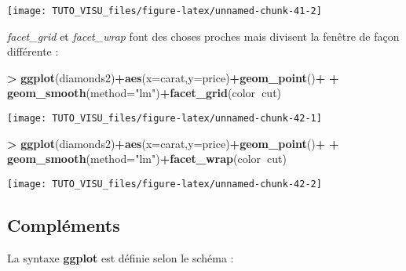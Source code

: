 \documentclass[]{article}
\newenvironment{Shaded}{\begin{snugshade}}{\end{snugshade}}
\newcommand{\DataTypeTok}[1]{\textcolor[rgb]{0.13,0.29,0.53}{#1}}
\newcommand{\KeywordTok}[1]{\textcolor[rgb]{0.13,0.29,0.53}{\textbf{#1}}}
\newcommand{\NormalTok}[1]{#1}
\newcommand{\OperatorTok}[1]{\textcolor[rgb]{0.81,0.36,0.00}{\textbf{#1}}}
\newcommand{\StringTok}[1]{\textcolor[rgb]{0.31,0.60,0.02}{#1}}
\theoremstyle{definition}
\theoremstyle{definition}
\theoremstyle{definition}
\theoremstyle{remark}
\begin{document}
\begin{center}\texttt{[image: TUTO\_VISU\_files/figure-latex/unnamed-chunk-41-2]} \end{center}

\emph{facet\_grid} et \emph{facet\_wrap} font des choses proches mais divisent la fenêtre de façon différente :

\begin{Shaded}
\begin{Highlighting}[]
\OperatorTok{>}\StringTok{ }\KeywordTok{ggplot}\NormalTok{(diamonds2)}\OperatorTok{+}\KeywordTok{aes}\NormalTok{(}\DataTypeTok{x=}\NormalTok{carat,}\DataTypeTok{y=}\NormalTok{price)}\OperatorTok{+}\KeywordTok{geom_point}\NormalTok{()}\OperatorTok{+}
\OperatorTok{+}\StringTok{   }\KeywordTok{geom_smooth}\NormalTok{(}\DataTypeTok{method=}\StringTok{"lm"}\NormalTok{)}\OperatorTok{+}\KeywordTok{facet_grid}\NormalTok{(color}\OperatorTok{~}\NormalTok{cut)}
\end{Highlighting}
\end{Shaded}

\begin{center}\texttt{[image: TUTO\_VISU\_files/figure-latex/unnamed-chunk-42-1]} \end{center}

\begin{Shaded}
\begin{Highlighting}[]
\OperatorTok{>}\StringTok{ }\KeywordTok{ggplot}\NormalTok{(diamonds2)}\OperatorTok{+}\KeywordTok{aes}\NormalTok{(}\DataTypeTok{x=}\NormalTok{carat,}\DataTypeTok{y=}\NormalTok{price)}\OperatorTok{+}\KeywordTok{geom_point}\NormalTok{()}\OperatorTok{+}
\OperatorTok{+}\StringTok{   }\KeywordTok{geom_smooth}\NormalTok{(}\DataTypeTok{method=}\StringTok{"lm"}\NormalTok{)}\OperatorTok{+}\KeywordTok{facet_wrap}\NormalTok{(color}\OperatorTok{~}\NormalTok{cut)}
\end{Highlighting}
\end{Shaded}

\begin{center}\texttt{[image: TUTO\_VISU\_files/figure-latex/unnamed-chunk-42-2]} \end{center}

\hypertarget{compluxe9ments}{%
\subsection{Compléments}\label{compluxe9ments}}

La syntaxe \textbf{ggplot} est définie selon le schéma :
\end{document}
